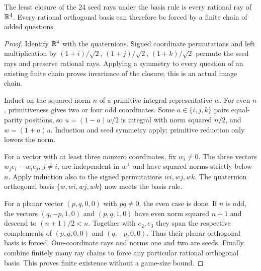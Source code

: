 \begin{theorem}\label{thm:closure}
The least closure of the 24 seed rays under the basis rule is every rational ray of $\mathbb R^4$. Every rational orthogonal basis can therefore be forced by a finite chain of added questions.
\end{theorem}
\begin{proof}
Identify $\mathbb R^4$ with the quaternions. Signed coordinate permutations and left multiplication by $(1+i)/\sqrt2$, $(1+j)/\sqrt2$, $(1+k)/\sqrt2$ permute the seed rays and preserve rational rays. Applying a symmetry to every question of an existing finite chain proves invariance of the closure; this is an actual image chain.

Induct on the squared norm $n$ of a primitive integral representative $w$. For even $n$, primitiveness gives two or four odd coordinates. Some $a\in\{i,j,k\}$ pairs equal-parity positions, so $u=(1-a)w/2$ is integral with norm squared $n/2$, and $w=(1+a)u$. Induction and seed symmetry apply; primitive reduction only lowers the norm.

For a vector with at least three nonzero coordinates, fix $w_i\ne0$. The three vectors $w_je_i-w_ie_j$, $j\ne i$, are independent in $w^\perp$ and have squared norms strictly below $n$. Apply induction also to the signed permutations $wi,wj,wk$. The quaternion orthogonal basis $\{w,wi,wj,wk\}$ now meets the basis rule.

For a planar vector $(p,q,0,0)$ with $pq\ne0$, the even case is done. If $n$ is odd, the vectors $(q,-p,1,0)$ and $(p,q,1,0)$ have even norm squared $n+1$ and descend to $(n+1)/2<n$. Together with $e_2,e_3$ they span the respective complements of $(p,q,0,0)$ and $(q,-p,0,0)$. Thus their planar orthogonal basis is forced. One-coordinate rays and norms one and two are seeds. Finally combine finitely many ray chains to force any particular rational orthogonal basis. This proves finite existence without a game-size bound.
\end{proof}

